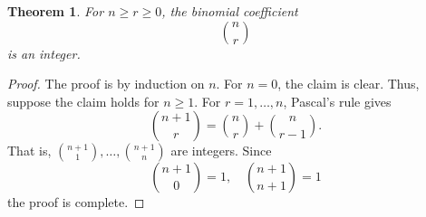 \documentclass[12pt]{article}
\newtheorem{thm}{Theorem}
\begin{document}
\begin{thm} For $n\ge r \ge 0$, the binomial coefficient
$$
  {n \choose r}
$$
is an integer.
\end{thm}

\begin{proof} The proof is by induction on $n$. For $n=0$, the
claim is clear. Thus, suppose the claim holds for $n\ge 1$. 
For $r=1,\ldots, n$, Pascal's rule gives
$$
  {n +1 \choose r} = {n\choose r} + {n\choose r-1}.
$$
That is,  ${n +1 \choose 1}, \ldots, {n+1 \choose n}$ are 
  integers. 
Since
$$
  {n +1\choose 0} = 1, \quad   {n +1\choose n+1} = 1
$$
the proof is complete. 
\end{proof}
\end{document}
